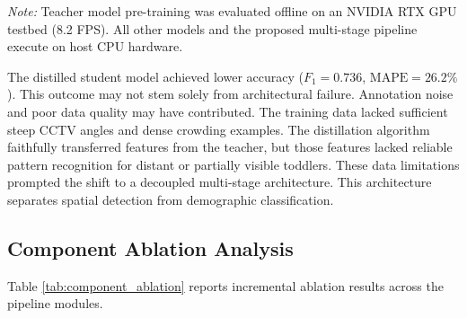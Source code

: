 \begin{table}[htbp]
\centering
\caption{Comparative Evaluation of Exploratory Distillation vs.\ Proposed Multi-Stage Pipeline}
\label{tab:distill_comparison}
\vspace{0.15cm}
\parbox{\textwidth}{\footnotesize \textit{Note:} Teacher model pre-training was evaluated offline on an NVIDIA RTX GPU testbed (8.2 FPS). All other models and the proposed multi-stage pipeline execute on host CPU hardware.}
\end{table}

The distilled student model achieved lower accuracy ($F_1 = 0.736$, $\text{MAPE} = 26.2\%$). This outcome may not stem solely from architectural failure. Annotation noise and poor data quality may have contributed. The training data lacked sufficient steep CCTV angles and dense crowding examples. The distillation algorithm faithfully transferred features from the teacher, but those features lacked reliable pattern recognition for distant or partially visible toddlers. These data limitations prompted the shift to a decoupled multi-stage architecture. This architecture separates spatial detection from demographic classification.

\subsection{Component Ablation Analysis}
Table \ref{tab:component_ablation} reports incremental ablation results across the pipeline modules.

